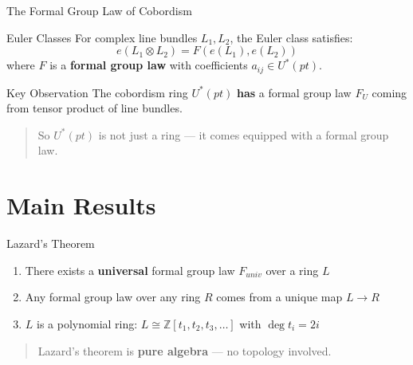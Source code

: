 \documentclass{beamer}
\begin{document}
\begin{frame}{The Formal Group Law of Cobordism}
  \begin{block}{Euler Classes}
    For complex line bundles $L_1, L_2$, the Euler class satisfies:
    \[
      e(L_1 \otimes L_2) = F(e(L_1), e(L_2))
    \]
    where $F$ is a \textbf{formal group law} with coefficients $a_{ij} \in U^*(pt)$.
  \end{block}
  \begin{block}{Key Observation}
    The cobordism ring $U^*(pt)$ \textbf{has} a formal group law $F_U$ coming from tensor product of line bundles.
  \end{block}
  \begin{quote}
    \small So $U^*(pt)$ is not just a ring — it comes equipped with a formal group law.
  \end{quote}
\end{frame}

\section{Main Results}

\begin{frame}{Lazard's Theorem}
  \begin{theorem}
   \begin{enumerate}
    \item There exists a \textbf{universal} formal group law $F_{univ}$ over a ring $L$
    \item Any formal group law over any ring $R$ comes from a unique map $L \to R$
    \item $L$ is a polynomial ring: $L \cong \mathbb{Z}[t_1, t_2, t_3, \dots]$ with $\deg t_i = 2i$
  \end{enumerate}   
  \end{theorem}

  \begin{quote}
    \small Lazard's theorem is \textbf{pure algebra} — no topology involved.
  \end{quote}
\end{frame}
\end{document}

